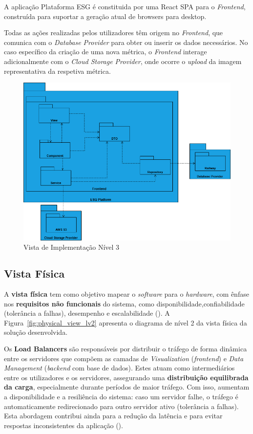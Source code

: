 A aplicação Plataforma ESG é constituida por uma React SPA para o \textit{Frontend}, construída para suportar a geração atual de browsers para desktop.

Todas as ações realizadas pelos utilizadores têm origem no \textit{Frontend}, que comunica com o \textit{Database Provider} para obter ou inserir os dados necessários. No caso específico da criação de uma nova métrica, o \textit{Frontend} interage adicionalmente com o \textit{Cloud Storage Provider}, onde ocorre o \textit{upload} da imagem representativa da respetiva métrica.

\begin{figure}[H]
    \centering
    \includegraphics[width=\linewidth,keepaspectratio]{frontmatter/assets/diagrams/Development View/Implementation Lv3.drawio.png}
    \caption{Vista de Implementação Nível 3}
    \label{fig:development_view_lv3}
\end{figure}
    
\subsection{Vista Física}

A \textbf{vista física} tem como objetivo mapear o \textit{software} para o \textit{hardware}, com ênfase nos \textbf{requisitos não funcionais} do sistema, como disponibilidade,confiabilidade (tolerância a falhas), desempenho e escalabilidade (\cite{Kruchten1995}). A Figura~\ref{fig:physical_view_lv2} apresenta o diagrama de nível 2 da vista física da solução desenvolvida.

Os \textbf{Load Balancers} são responsáveis por distribuir o tráfego de forma dinâmica entre os servidores que compõem as camadas de \textit{Visualization} (\textit{frontend}) e \textit{Data Management} (\textit{backend} com base de dados). Estes atuam como intermediários entre os utilizadores e os servidores, assegurando uma \textbf{distribuição equilibrada da carga}, especialmente durante períodos de maior tráfego. Com isso, aumentam a disponibilidade e a resiliência do sistema: caso um servidor falhe, o tráfego é automaticamente redirecionado para outro servidor ativo (tolerância a falhas). Esta abordagem contribui ainda para a redução da latência e para evitar respostas inconsistentes da aplicação (\Cite{F52025}).

